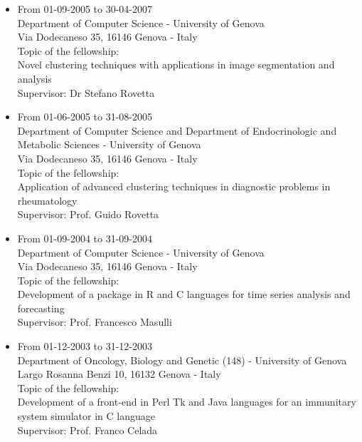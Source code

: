 \documentclass[a4paper,10pt]{article}
\begin{document}
\begin{itemize}
\item From 01-09-2005 to 30-04-2007 \\
  Department of Computer Science - University of Genova \\
  Via Dodecaneso 35, 16146 Genova - Italy \\
  Topic of the fellowship: \\
  Novel clustering techniques with applications in image segmentation and analysis \\
  Supervisor: Dr Stefano Rovetta

\item From 01-06-2005 to 31-08-2005 \\
  Department of Computer Science and Department of Endocrinologic and Metabolic Sciences - University of Genova \\
  Via Dodecaneso 35, 16146 Genova - Italy \\
  Topic of the fellowship: \\
  Application of advanced clustering techniques in diagnostic problems in rheumatology \\
  Supervisor: Prof. Guido Rovetta

\item From 01-09-2004 to 31-09-2004 \\
  Department of Computer Science - University of Genova \\
  Via Dodecaneso 35, 16146 Genova - Italy \\
  Topic of the fellowship: \\
  Development of a package in R and C languages for time series analysis and forecasting \\
  Supervisor: Prof. Francesco Masulli

\item From 01-12-2003 to 31-12-2003 \\
  Department of Oncology, Biology and Genetic (148) - University of Genova \\
  Largo Rosanna Benzi 10, 16132 Genova - Italy \\
  Topic of the fellowship: \\
  Development of a front-end in Perl Tk and Java languages for an immunitary system simulator in C language \\
  Supervisor: Prof. Franco Celada

\end{itemize}
\end{document}
